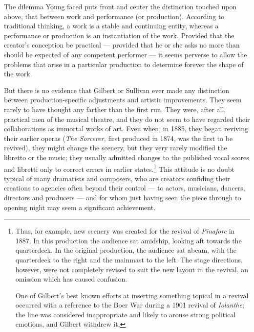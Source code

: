 \begin{paper}
The dilemma Young faced puts front and center the distinction touched
upon above, that between work and performance (or production). According
to traditional thinking, a work is a stable and continuing entity,
whereas a performance or production is an instantiation of the work.
Provided that the creator's conception be practical --- provided that he
or she asks no more than should be expected of any competent
performer --- it seems perverse to allow the problems that arise in a
particular production to determine forever the shape of the work.

But there is no evidence that Gilbert or Sullivan ever made any
distinction between production-specific adjustments and artistic
improvements. They seem rarely to have thought any farther than the
first run. They were, after all, practical men of the musical theatre,
and they do not seem to have regarded their collaborations as immortal
works of art. Even when, in 1885, they began reviving their earlier
operas (\emph{The Sorcerer,} first produced in 1874\emph{,} was the
first to be revived), they might change the scenery, but they very
rarely modified the libretto or the music; they usually admitted changes
to the published vocal scores and libretti only to correct errors in
earlier states.\footnote{Thus, for example, new scenery was created for
  the revival of \emph{Pinafore} in 1887. In this production the
  audience sat amidship, looking aft towards the quarterdeck. In the
  original production, the audience sat abeam, with the quarterdeck to
  the right and the mainmast to the left. The stage directions, however,
  were not completely revised to suit the new layout in the revival, an
  omission which has caused confusion.

  One of Gilbert's best known efforts at inserting something topical in
  a revival occurred with a reference to the Boer War during a 1901
  revival of \emph{Iolanthe}; the line was considered inappropriate and
  likely to arouse strong political emotions, and Gilbert withdrew it.}
This attitude is no doubt typical of many dramatists and composers, who
are creators confiding their creations to agencies often beyond their
control --- to actors, musicians, dancers, directors and producers --- and
for whom just having seen the piece through to opening night may seem a
significant achievement.


\end{paper}
